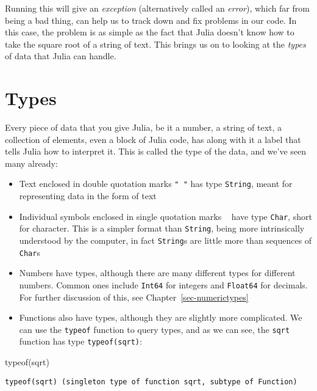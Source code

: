 \documentclass[
  letterpaper,
  DIV=11,
  numbers=noendperiod]{scrreprt}
\newenvironment{Shaded}{\begin{snugshade}}{\end{snugshade}}
\newcommand{\FunctionTok}[1]{\textcolor[rgb]{0.28,0.35,0.67}{#1}}
\newcommand{\NormalTok}[1]{\textcolor[rgb]{0.00,0.23,0.31}{#1}}
\begin{document}
Running this will give an \emph{exception} (alternatively called an
\emph{error}), which far from being a bad thing, can help us to track
down and fix problems in our code. In this case, the problem is as
simple as the fact that Julia doesn't know how to take the square root
of a string of text. This brings us on to looking at the \emph{types} of
data that Julia can handle.

\hypertarget{types}{%
\section{Types}\label{types}}

Every piece of data that you give Julia, be it a number, a string of
text, a collection of elements, even a block of Julia code, has along
with it a label that tells Julia how to interpret it. This is called the
type of the data, and we've seen many already:

\begin{itemize}
\item
  Text enclosed in double quotation marks \texttt{"\ "} has type
  \texttt{String}, meant for representing data in the form of text
\item
  Individual symbols enclosed in single quotation marks
  \texttt{\textquotesingle{}\ \textquotesingle{}} have type
  \texttt{Char}, short for character. This is a simpler format than
  \texttt{String}, being more intrinsically understood by the computer,
  in fact \texttt{String}s are little more than sequences of
  \texttt{Char}s
\item
  Numbers have types, although there are many different types for
  different numbers. Common ones include \texttt{Int64} for integers and
  \texttt{Float64} for decimals. For further discussion of this, see
  Chapter~\ref{sec-numerictypes}
\item
  Functions also have types, although they are slightly more
  complicated. We can use the \texttt{typeof} function to query types,
  and as we can see, the \texttt{sqrt} function has type
  \texttt{typeof(sqrt)}:
\end{itemize}

\begin{Shaded}
\begin{Highlighting}[]
\FunctionTok{typeof}\NormalTok{(sqrt)}
\end{Highlighting}
\end{Shaded}

\begin{verbatim}
typeof(sqrt) (singleton type of function sqrt, subtype of Function)
\end{verbatim}
\end{document}
